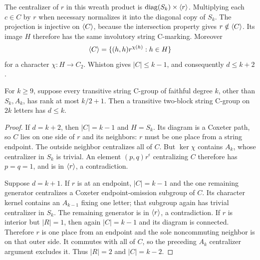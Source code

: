 The centralizer of $r$ in this wreath product is
$\operatorname{diag}(S_k)\times\langle r\rangle$. Multiplying each $c\in C$
by $r$ when necessary normalizes it into the diagonal copy of $S_k$.
The projection is injective on $\langle C\rangle$, because the intersection
property gives $r\notin\langle C\rangle$. Its image $H$ therefore has the
same involutory string C-marking. Moreover
\[
 \langle C\rangle=\{(h,h)r^{\chi(h)}:h\in H\}
\]
for a character $\chi:H\to C_2$. Whiston gives $|C|\leq k-1$,
and consequently $d\leq k+2$.

\begin{theorem}\label{twoblocks}
For $k\geq9$, suppose every transitive string C-group of faithful degree
$k$, other than $S_k,A_k$, has rank at most $k/2+1$. Then a transitive
two-block string C-group on $2k$ letters has $d\leq k$.
\end{theorem}
\begin{proof}
If $d=k+2$, then $|C|=k-1$ and $H=S_k$. Its diagram is a Coxeter
path, so $C$ lies on one side of $r$ and its neighbors: $r$ must be
one place from a string endpoint. The outside neighbor centralizes
all of $C$. But $\ker\chi$ contains $A_k$, whose centralizer in
$S_k$ is trivial. An element $(p,q)r^\epsilon$ centralizing $C$
therefore has $p=q=1$, and is in $\langle r\rangle$, a contradiction.

Suppose $d=k+1$. If $r$ is at an endpoint, $|C|=k-1$ and the one
remaining generator centralizes a Coxeter endpoint-omission subgroup
of $C$. Its character kernel contains an $A_{k-1}$ fixing one letter;
that subgroup again has trivial centralizer in $S_k$. The remaining
generator is in $\langle r\rangle$, a contradiction. If $r$ is interior but
$|R|=1$, then again $|C|=k-1$ and its diagram is connected. Therefore
$r$ is one place from an endpoint and the sole noncommuting neighbor
is on that outer side. It commutes with all of $C$, so the preceding
$A_k$ centralizer argument excludes it. Thus $|R|=2$ and $|C|=k-2$.


\end{proof}
